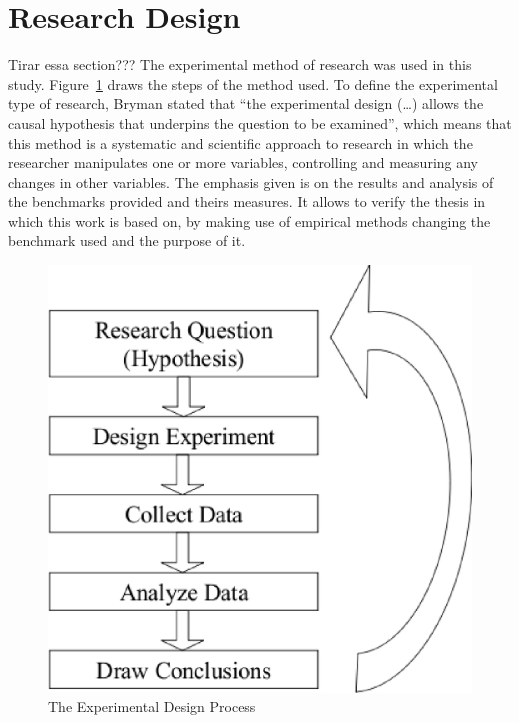 \section{Research Design} \label{sec3:research_design} 
Tirar essa section???    
The experimental method of research was used in this study. Figure~\ref{fig:experimental_method_approach} draws the steps of the method used. To define the experimental type of research, Bryman \cite{bryman89} stated that ``the experimental design (\ldots) allows the causal hypothesis that underpins the question to be examined'', which means that this method is a systematic and scientific approach to research in which the researcher manipulates one or more variables, controlling and measuring any changes in other variables. The emphasis given is on the results and analysis of the benchmarks provided and theirs measures. It allows to verify the thesis in which this work is based on, by making use of empirical methods changing the benchmark used and the purpose of it.
    \begin{figure}[!htb]
        \centering
            \includegraphics[scale=0.5]{graphics/experimental_method_approach}
            \caption{The Experimental Design Process}
            \label{fig:experimental_method_approach}
    \end{figure}
    
